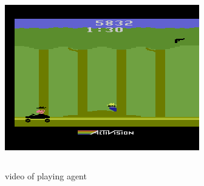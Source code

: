 \documentclass{beamer}
\begin{document}
\begin{frame}
\begin{columns}
    \begin{column}{0.5\textwidth}
      \includegraphics[scale=0.4]{../images/privateeye.png}
    \end{column}
  
  \end{columns}

\end{frame}

\begin{frame}
  video of playing agent
\end{frame}
\end{document}
